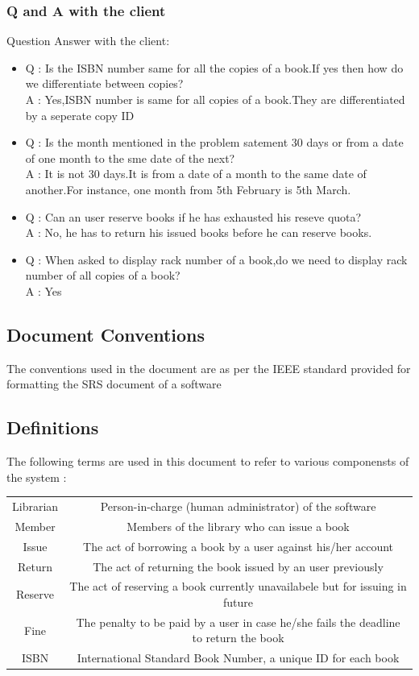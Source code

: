 \documentclass{article}
\begin{document}
\subsubsection*{Q and A with the client}
Question Answer with the client:
\begin{itemize}
\item Q : Is the ISBN number same for all the copies of a book.If yes then how do we differentiate between copies?
\\A : Yes,ISBN number is same for all copies of a book.They are differentiated by a seperate copy ID

\item Q : Is the month mentioned in the problem satement 30 days or from a date of one month to the sme date of the next?
\\A : It is not 30 days.It is from a date of a month to the same date of another.For instance, one month from 5th February is 5th March.

\item Q : Can an user reserve books if he has exhausted his reseve quota?
\\A : No, he has to return his issued books before he can reserve books.

\item Q : When asked to display rack number of a book,do we need to display rack number of all copies of a book?
\\A : Yes
\end{itemize}
\subsection{Document Conventions}
The conventions used in the document are as per the IEEE standard provided for formatting the SRS document of a software

\subsection{Definitions}
The following terms are used in this document to refer to various componensts of the system :\\

\begin{tabular}{ c| c }
 Librarian & Person-in-charge (human administrator) of the software\\
 Member & Members of the library who can issue a book\\
 Issue & The act of borrowing a book by a user against his/her account\\
 Return & The act of returning the book issued by an user previously \\
 Reserve & The act of reserving a book currently unavailabele but for issuing in future\\
 Fine & The penalty to be paid by a user in case he/she fails the deadline to return the book\\
 ISBN & International Standard Book Number, a unique ID for each book
\end{tabular}	
\end{document}
